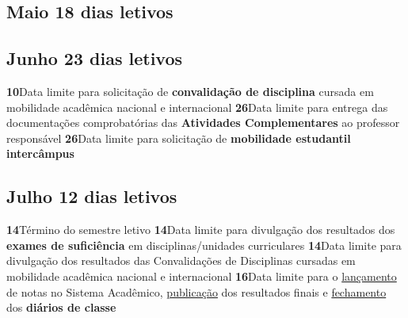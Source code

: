 \documentclass[thesis]{hmcposter}
\begin{document}
\begin{poster}
\subsection{Maio \hfill 18 dias letivos}\subsection{Junho \hfill 23 dias letivos}\textbf{10}\qquad Data limite para solicitação de \textbf{convalidação de disciplina} cursada em mobilidade acadêmica nacional e internacional \newline \null\textbf{26}\qquad Data limite para entrega das documentações comprobatórias das \textbf{Atividades Complementares} ao professor responsável \newline \null\textbf{26}\qquad Data limite para solicitação de \textbf{mobilidade estudantil intercâmpus} \newline \null\subsection{Julho \hfill 12 dias letivos}\textbf{14}\qquad Término do semestre letivo \newline \null\textbf{14}\qquad Data limite para divulgação dos resultados dos \textbf{exames de suficiência} em disciplinas/unidades curriculares \newline \null\textbf{14}\qquad Data limite para divulgação dos resultados das Convalidações de Disciplinas cursadas em mobilidade acadêmica nacional e internacional \newline \null\textbf{16}\qquad Data limite para o \underline{lançamento} de notas no Sistema Acadêmico, \underline{publicação} dos resultados finais e \underline{fechamento} dos \textbf{diários de classe} \newline \null\newpage

\end{poster}
\end{document}
